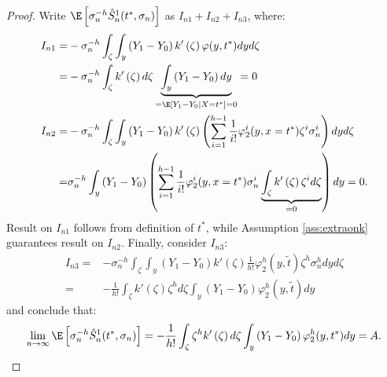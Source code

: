 {\begin{proof}
        Write $\E \left[ \sigma_n^{-h} \hat{S}_n^1(t^*,\sigma_n) \right] $ as $I_{n1} + I_{n2} + I_{n3}$, where:
        \begin{align}
            I_{n1} =&- \sigma_n^{-h} \int_\zeta \int_y \left(Y_1 - Y_0 \right) k'\left(\zeta \right)  \varphi(y,t^*) d y d \zeta \\
            =&  - \sigma_n^{-h}\int_\zeta k'\left(\zeta \right)d \zeta \underbrace{\int_y \left(Y_1 - Y_0 \right) d y}_{=\E[Y_1 - Y_0 |X=t^*]=0} = 0 \\
            I_{n2} =& - \sigma_n^{-h} \int_\zeta \int_y \left(Y_1 - Y_0 \right) k'\left(\zeta \right)  \left( \sum_{i=1}^{h-1} \frac{1}{i!} \varphi^{i}_2(y,x=t^*) \zeta^i \sigma_n^i \right) d y d \zeta \\
            =& \sigma_n^{-h} \int_y \left(Y_1 - Y_0 \right) \left( \sum_{i=1}^{h-1} \frac{1}{i!} \varphi^{i}_2(y,x=t^*) \sigma_n^i \underbrace{\int_\zeta k'\left(\zeta \right) \zeta^i  d \zeta}_{=0} \right) d y = 0.
        \end{align}
        Result on $I_{n1}$ follows from definition of $t^*$, while Assumption \ref{ass:extraonk} guarantees result on $I_{n2}$. Finally, consider $I_{n3}$:
        \begin{align}
             I_{n3} =&- \sigma_n^{-h} \int_\zeta \int_y \left(Y_1 - Y_0 \right) k'\left(\zeta \right)  \frac{1}{h!} \varphi^{h}_2(y,\tilde{t}) \zeta^h \sigma_n^h d y d \zeta \\
             =& -\frac{1}{h!} \int_\zeta k'\left(\zeta \right) \zeta^h d \zeta \int_y \left(Y_1 - Y_0 \right) \varphi^{h}_2(y,\tilde{t}) d y
        \end{align}
        and conclude that:
        \begin{gather}
            \lim_{n\rightarrow \infty} \E \left[ \sigma_n^{-h} \hat{S}_n^1(t^*,\sigma_n) \right] = -\frac{1}{h!} \int_\zeta \zeta^h k'\left(\zeta \right) d \zeta \int_y \left(Y_1 - Y_0 \right) \varphi^{h}_2(y,t^*) d y = A.
        \end{gather}


\end{proof}}
